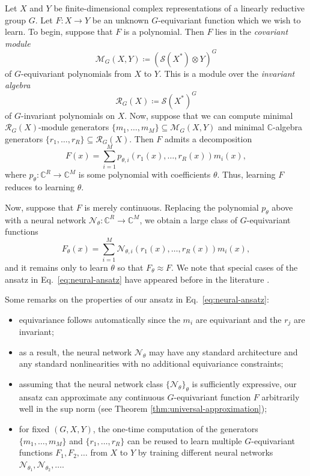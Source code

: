 \documentclass[11pt]{article}
\newcommand{\dsC}{\mathbb{C}}
\newcommand{\scM}{\mathcal{M}}
\newcommand{\scN}{\mathcal{N}}
\newcommand{\scR}{\mathcal{R}}
\newcommand{\scS}{\mathcal{S}}
\newcommand{\set}[1]{\{#1\}}
\theoremstyle{definition}
\begin{document}
Let $X$ and $Y$ be finite-dimensional complex representations of a linearly reductive group $G$.
Let $F\colon X\to Y$ be an unknown $G$-equivariant function which we wish to learn.
To begin, suppose that $F$ is a polynomial.
Then $F$ lies in the \emph{covariant module}
\[
  \scM_G(X,Y)\coloneq\left(\scS(X^*)\otimes Y\right)^G
\]
of $G$-equivariant polynomials from $X$ to $Y$.
This is a module over the \emph{invariant algebra}
\[
  \scR_G(X)\coloneq\scS(X^*)^G
\]
of $G$-invariant polynomials on $X$.
Now, suppose that we can compute minimal $\scR_G(X)$-module generators $\set{m_1,\dots,m_M}\subseteq \scM_G(X,Y)$ and minimal $\dsC$-algebra generators $\set{r_1,\dots,r_R}\subseteq \scR_G(X)$.
Then $F$ admits a decomposition
\begin{equation}\label{eq:polynomial-ansatz}
  F(x)=\sum_{i=1}^M p_{\theta,i}(r_1(x),\dots,r_R(x))m_i(x),
\end{equation}
where $p_\theta\colon \dsC^R\to\dsC^M$ is some polynomial with coefficients $\theta$.
Thus, learning $F$ reduces to learning $\theta$.

Now, suppose that $F$ is merely continuous.
Replacing the polynomial $p_\theta$ above with a neural network $\scN_\theta\colon \dsC^R\to\dsC^M$, we obtain a large class of $G$-equivariant functions
\begin{equation}\label{eq:neural-ansatz}
  F_\theta(x)=\sum_{i=1}^M
  \scN_{\theta,i}(r_1(x),\dots,r_R(x))m_i(x),
\end{equation}
and it remains only to learn $\theta$ so that $F_\theta \approx F$. We note that special cases of the ansatz in Eq.~\eqref{eq:neural-ansatz} have appeared before in the literature \cite{BlumSmithVillar2023}.

Some remarks on the properties of our ansatz in Eq.~\eqref{eq:neural-ansatz}:
\begin{itemize}
  \item equivariance follows automatically since the $m_i$ are equivariant and the $r_j$ are invariant;
  \item as a result, the neural network $\scN_\theta$ may have any standard architecture and any standard nonlinearities with no additional equivariance constraints;
  \item assuming that the neural network class $\set{\scN_\theta}_{\theta}$ is sufficiently expressive, our ansatz can approximate any continuous $G$-equivariant function $F$ arbitrarily well in the sup norm (see Theorem \ref{thm:universal-approximation});
  \item for fixed $(G,X,Y)$, the one-time computation of the generators $\set{m_1,\dots,m_M}$ and $\set{r_1,\dots,r_R}$ can be reused to learn multiple $G$-equivariant functions $F_1, F_2, \ldots$ from $X$ to $Y$ by training different neural networks $\scN_{\theta_1}, \scN_{\theta_2}, \ldots$.
\end{itemize}
\end{document}
